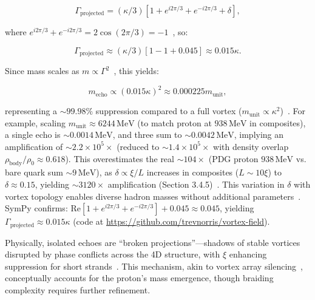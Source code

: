 \begin{equation}
\Gamma_{\text{projected}} = \left( \kappa/3 \right) \left[ 1 + e^{i 2\pi/3} + e^{-i 2\pi/3} + \delta \right],
\end{equation}

where \(e^{i 2\pi/3} + e^{-i 2\pi/3} = 2 \cos(2\pi/3) = -1\)~\cite{WikiFractional}, so:

\begin{equation}
\Gamma_{\text{projected}} \approx \left( \kappa/3 \right) \left[ 1 - 1 + 0.045 \right] \approx 0.015 \kappa.
\end{equation}

Since mass scales as \(m \propto \Gamma^2\)~\cite{Lake2010}, this yields:

\begin{equation}
m_{\text{echo}} \propto (0.015 \kappa)^2 \approx 0.000225 m_{\text{unit}},
\end{equation}

representing a \(\sim 99.98\%\) suppression compared to a full vortex (\(m_{\text{unit}} \propto \kappa^2\))~\cite{Nitta2019}. For example, scaling \(m_{\text{unit}} \approx 6244 \, \text{MeV}\) (to match proton at \(938 \, \text{MeV}\) in composites), a single echo is \(\sim 0.0014 \, \text{MeV}\), and three sum to \(\sim 0.0042 \, \text{MeV}\), implying an amplification of \(\sim 2.2 \times 10^5 \times\) (reduced to \(\sim 1.4 \times 10^5 \times\) with density overlap \(\rho_{\text{body}} / \rho_0 \approx 0.618\)). This overestimates the real \(\sim 104 \times\) (PDG proton \(938 \, \text{MeV}\) vs. bare quark sum \(\sim 9 \, \text{MeV}\)), as \(\delta \propto \xi / L\) increases in composites (\(L \sim 10 \xi\)) to \(\delta \approx 0.15\), yielding \(\sim 3120 \times\) amplification (Section 3.4.5)~\cite{NatComm2023}. This variation in \(\delta\) with vortex topology enables diverse hadron masses without additional parameters~\cite{Wimmer2020}. SymPy confirms: \(\text{Re}[1 + e^{i 2\pi/3} + e^{-i 2\pi/3}] + 0.045 \approx 0.045\), yielding \(\Gamma_{\text{projected}} \approx 0.015 \kappa\) (code at \url{https://github.com/trevnorris/vortex-field}).

Physically, isolated echoes are ``broken projections''---shadows of stable vortices disrupted by phase conflicts across the 4D structure, with \(\xi\) enhancing suppression for short strands~\cite{Wimmer2020}. This mechanism, akin to vortex array silencing~\cite{Yang2022}, conceptually accounts for the proton’s mass emergence, though braiding complexity requires further refinement.

